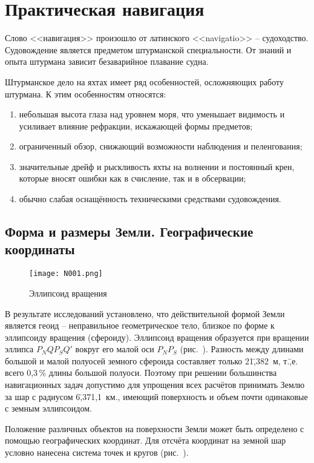 \twocolumn

\chapter{Практическая навигация}\label{chap:6}

Слово <<навигация>> произошло от латинского <<navigatio>> \---
судоходство. Судовождение является предметом штурманской
специальности. От знаний и опыта штурмана зависит безаварийное
плавание судна.

Штурманское дело на яхтах имеет ряд особенностей, осложняющих работу
штурмана. К этим особенностям относятся:
\begin{enumerate}
\item небольшая высота глаза над уровнем моря, что уменьшает видимость
  и усиливает влияние рефракции, искажающей формы предметов;
\item ограниченный обзор, снижающий возможности наблюдения и
  пеленгования;
\item значительные дрейф и рыскливость яхты на волнении и постоянный
  крен, которые вносят ошибки как в счисление, так и в обсервации;
\item обычно слабая оснащённость техническими средствами судовождения. 
\end{enumerate}

\section{Форма и размеры Земли. Географические координаты} 

\begin{figure}[htb]
  \centering{}
  \texttt{[image: N001.png]}
  \caption{Эллипсоид вращения}
  \label{fig:N1}
\end{figure}

В результате исследований установлено, что действительной формой Земли
является геоид \--- неправильное геометрическое тело, близкое по форме
к эллипсоиду вращения (сфероиду). Эллипсоид вращения образуется при
вращении эллипса $P_NQP_SQ'$ вокруг его малой оси $P_NP_S$
(рис.~). Разность между длинами большой и малой полуосей
земного сфероида составляет только 21\=,382~м, т.\=,е. всего 0,3\,\%
длины большой полуоси. Поэтому при решении большинства навигационных
задач допустимо для упрощения всех расчётов принимать Землю за шар с
радиусом 6\=,371,1~км., имеющий поверхность и объем почти одинаковые с
земным эллипсоидом.

Положение различных объектов на поверхности Земли может быть
определено с помощью географических координат. Для отсчёта координат
на земной шар условно нанесена система точек и кругов (рис.~).

